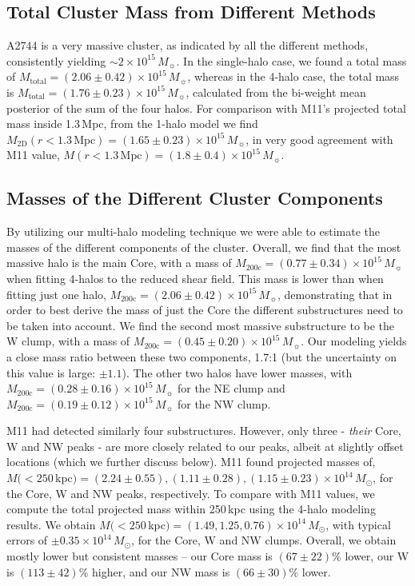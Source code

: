 \documentclass[iop,twocolumn]{emulateapj}
\def\munit{\mbox{$10^{15}\,M_\sun$}}
\begin{document}
\subsection{Total Cluster Mass from Different Methods}
\label{subsec:Mtot}
A2744 is a very massive cluster, as indicated by all the different
methods,  consistently yielding $\sim2\times \munit$. In the single-halo
case, we found a total mass of $M_\mathrm{total}=(2.06\pm0.42)\times\munit$, whereas in
the 4-halo case, the total mass is
$M_\mathrm{total}=(1.76\pm0.23)\times\munit$, calculated from the bi-weight mean posterior of the sum of the four halos. For comparison with M11's projected total mass inside 1.3\,Mpc, from the 1-halo model we find $M_\mathrm{2D}(r<1.3\,\mathrm{Mpc})=(1.65\pm0.23)\times\munit$, in very good agreement with M11 value, $M(r<1.3\,\mathrm{Mpc})=(1.8\pm0.4)\times\munit$.




\subsection{Masses of the Different Cluster Components}
\label{subsec:Msub}
By utilizing our multi-halo modeling technique we were able to estimate the masses of the different components of the cluster. Overall, we find that the most massive halo is the main Core, with a mass of 
$M_\mathrm{200c}=(0.77\pm0.34)\times \munit$ when fitting 4-halos to the reduced shear field. This mass is lower than when fitting just one halo, $M_\mathrm{200c}=(2.06\pm0.42)\times \munit$, demonstrating that in order to best derive the mass of just the Core the different substructures need to be taken into account. We find the second most massive substructure to be the W clump, with a mass of
$M_\mathrm{200c} = (0.45\pm0.20)\times\munit$. Our modeling yields a close mass ratio between these two components,  1.7:1 (but the uncertainty on this value is large: $\pm1.1$).
The other two halos have lower masses, with $M_\mathrm{200c} = (0.28\pm0.16)\times\munit$ for the NE clump and $M_\mathrm{200c} = (0.19\pm0.12)\times\munit$ for the NW clump.

M11 had detected similarly four substructures. However, only three -  {\em their} Core, W and NW peaks - are more closely related to our peaks, albeit at slightly offset locations (which we further discuss below). 
M11 found projected masses of, $M(<250$\,kpc$)=(2.24\pm 0.55),(1.11\pm0.28),(1.15\pm0.23)\times10^{14}\,M_\odot$, for the Core, W and NW peaks, respectively. To compare with M11 values, we compute the total projected mass within 250\,kpc using the 4-halo modeling results. We obtain $M(<250$\,kpc$)=(1.49,1.25,0.76)\times10^{14}\,M_\odot$, with typical errors of $\pm0.35\times10^{14}\,M_\odot$, for the Core, W and NW clumps.  
Overall, we obtain mostly lower but consistent masses -- our Core mass is $(67\pm22)\%$ lower,   our W is $(113\pm42)\%$ higher, and our NW mass is $(66\pm30)\%$ lower.
\end{document}
